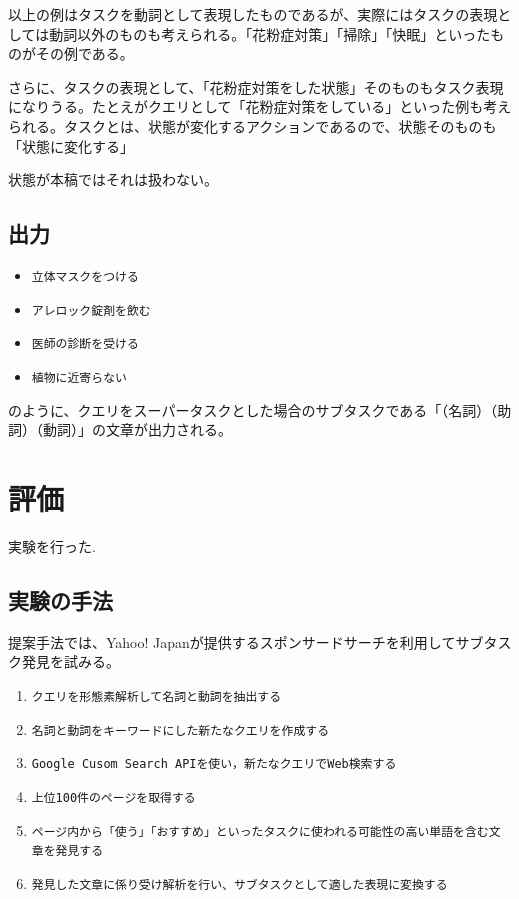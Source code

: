 \documentclass[submit,techreq]{ipsj}
\def\|{\verb|}
\begin{document}
以上の例はタスクを動詞として表現したものであるが、実際にはタスクの表現としては動詞以外のものも考えられる。「花粉症対策」「掃除」「快眠」といったものがその例である。

さらに、タスクの表現として、「花粉症対策をした状態」そのものもタスク表現になりうる。たとえがクエリとして「花粉症対策をしている」といった例も考えられる。タスクとは、状態が変化するアクションであるので、状態そのものも「状態に変化する」

状態が本稿ではそれは扱わない。


\subsection{出力}

\begin{itemize}
\item \|立体マスクをつける|
\item \|アレロック錠剤を飲む|
\item \|医師の診断を受ける|
\item \|植物に近寄らない|
\end{itemize}

のように、クエリをスーパータスクとした場合のサブタスクである「（名詞）（助詞）（動詞）」の文章が出力される。



\section{評価}
実験を行った.

\subsection{実験の手法}

提案手法では、Yahoo! Japanが提供するスポンサードサーチを利用してサブタスク発見を試みる。


\begin{enumerate}
\item \|クエリを形態素解析して名詞と動詞を抽出する|
\item \|名詞と動詞をキーワードにした新たなクエリを作成する|
\item \|Google Cusom Search APIを使い，新たなクエリでWeb検索する|
\item \|上位100件のページを取得する|
\item \|ページ内から「使う」「おすすめ」といったタスクに使われる可能性の高い単語を含む文章を発見する|
\item \|発見した文章に係り受け解析を行い、サブタスクとして適した表現に変換する|

\end{enumerate}
\end{document}
